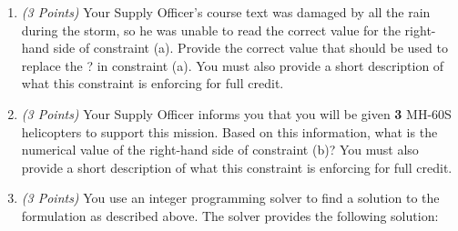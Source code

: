 \documentclass[10pt]{article}
\newcommand{\points}[1]{{\it (#1 Points)}}
\begin{document}
\begin{enumerate}

\item \points{3} Your Supply Officer's course text was damaged by all the rain during the storm, so he was unable to read the correct value for the right-hand side of constraint (a).  Provide the correct value that should be used to replace the ? in constraint (a).  You must also provide a short description of what this constraint is enforcing for full credit.

\vspace{1.5cm}
\vfill

\item \points{3} Your Supply Officer informs you that you will be given {\bf 3} MH-60S helicopters to support this mission.  Based on this information, what is the numerical value of the right-hand side of constraint (b)?  You must also provide a short description of what this constraint is enforcing for full credit.

\vfill

\newpage

\item \points{3} You use an integer programming solver to find a solution to the formulation as described above. The solver provides the following solution: 

\begin{center}
\end{center}
\end{enumerate}
\end{document}
